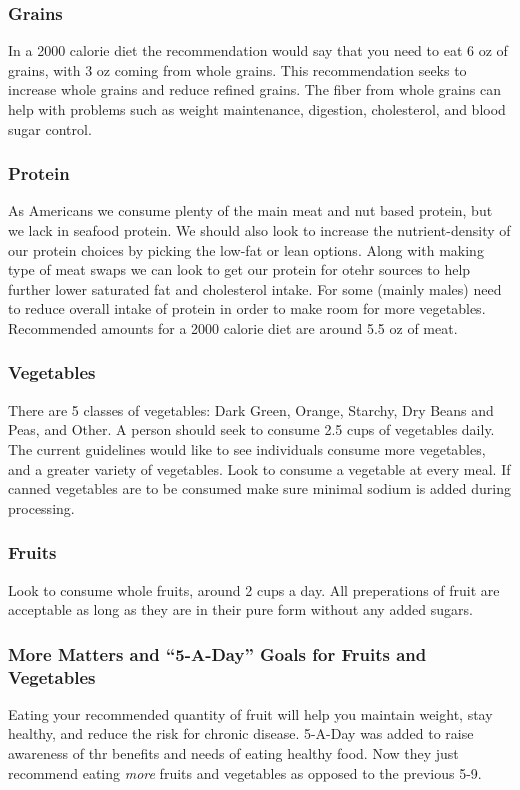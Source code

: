 \documentclass[letterpaper, 11pt]{article}
\begin{document}
\subsubsection{Grains}
\label{sec:org8b682d2}
In a 2000 calorie diet the recommendation would say that you need to eat 6 oz of grains, with 3 oz coming from whole grains. This recommendation seeks to increase whole grains and reduce refined grains. The fiber from whole grains can help with problems such as weight maintenance, digestion, cholesterol, and blood sugar control.\\
\subsubsection{Protein}
\label{sec:orgd0fb7a9}
As Americans we consume plenty of the main meat and nut based protein, but we lack in seafood protein. We should also look to increase the nutrient-density of our protein choices by picking the low-fat or lean options. Along with making type of meat swaps we can look to get our protein for otehr sources to help further lower saturated fat and cholesterol intake. For some (mainly males) need to reduce overall intake of protein in order to make room for more vegetables. Recommended amounts for a 2000 calorie diet are around 5.5 oz of meat.\\
\subsubsection{Vegetables}
\label{sec:org36a4afb}
There are 5 classes of vegetables: Dark Green, Orange, Starchy, Dry Beans and Peas, and Other. A person should seek to consume 2.5 cups of vegetables daily. The current guidelines would like to see individuals consume more vegetables, and a greater variety of vegetables. Look to consume a vegetable at every meal. If canned vegetables are to be consumed make sure minimal sodium is added during processing.\\
\subsubsection{Fruits}
\label{sec:orgc80154c}
Look to consume whole fruits, around 2 cups a day. All preperations of fruit are acceptable as long as they are in their pure form without any added sugars.\\
\subsubsection{More Matters and ``5-A-Day'' Goals for Fruits and Vegetables}
\label{sec:orgd25a1c2}
Eating your recommended quantity of fruit will help you maintain weight, stay healthy, and reduce the risk for chronic disease. 5-A-Day was added to raise awareness of thr benefits and needs of eating healthy food. Now they just recommend eating \emph{more} fruits and vegetables as opposed to the previous 5-9.\\
\end{document}
